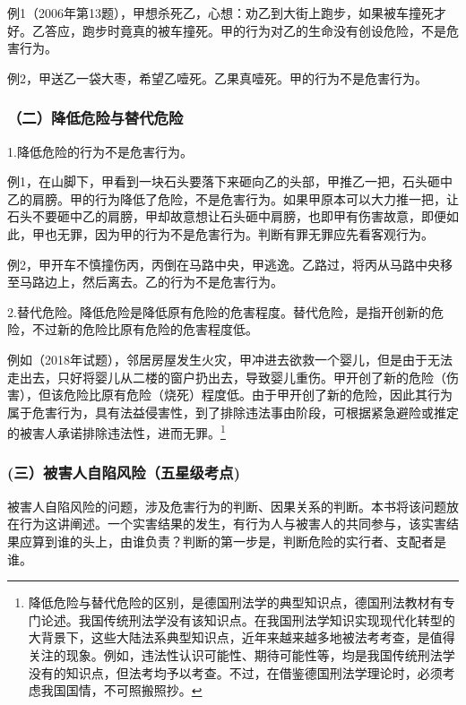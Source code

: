 例1（2006年第13题），甲想杀死乙，心想：劝乙到大街上跑步，如果被车撞死才好。乙答应，跑步时竟真的被车撞死。甲的行为对乙的生命没有创设危险，不是危害行为。

例2，甲送乙一袋大枣，希望乙噎死。乙果真噎死。甲的行为不是危害行为。

\subsubsection*{（二）降低危险与替代危险}

1.降低危险的行为不是危害行为。

例1，在山脚下，甲看到一块石头要落下来砸向乙的头部，甲推乙一把，石头砸中乙的肩膀。甲的行为降低了危险，不是危害行为。如果甲原本可以大力推一把，让石头不要砸中乙的肩膀，甲却故意想让石头砸中肩膀，也即甲有伤害故意，即便如此，甲也无罪，因为甲的行为不是危害行为。判断有罪无罪应先看客观行为。

例2，甲开车不慎撞伤丙，丙倒在马路中央，甲逃逸。乙路过，将丙从马路中央移至马路边上，然后离去。乙的行为不是危害行为。

2.替代危险。降低危险是降低原有危险的危害程度。替代危险，是指开创新的危险，不过新的危险比原有危险的危害程度低。

例如（2018年试题），邻居房屋发生火灾，甲冲进去欲救一个婴儿，但是由于无法走出去，只好将婴儿从二楼的窗户扔出去，导致婴儿重伤。甲开创了新的危险（伤害），但该危险比原有危险（烧死）程度低。由于甲开创了新的危险，因此其行为属于危害行为，具有法益侵害性，到了排除违法事由阶段，可根据紧急避险或推定的被害人承诺排除违法性，进而无罪。\footnote{降低危险与替代危险的区别，是德国刑法学的典型知识点，德国刑法教材有专门论述。我国传统刑法学没有该知识点。在我国刑法学知识实现现代化转型的大背景下，这些大陆法系典型知识点，近年来越来越多地被法考考查，是值得关注的现象。例如，违法性认识可能性、期待可能性等，均是我国传统刑法学没有的知识点，但法考均予以考查。不过，在借鉴德国刑法学理论时，必须考虑我国国情，不可照搬照抄。}

\subsubsection*{(三）被害人自陷风险（五星级考点)\protect\footnotemark}

被害人自陷风险的问题，涉及危害行为的判断、因果关系的判断。本书将该问题放在行为这讲阐述。一个实害结果的发生，有行为人与被害人的共同参与，该实害结果应算到谁的头上，由谁负责？判断的第一步是，判断危险的实行者、支配者是谁。

